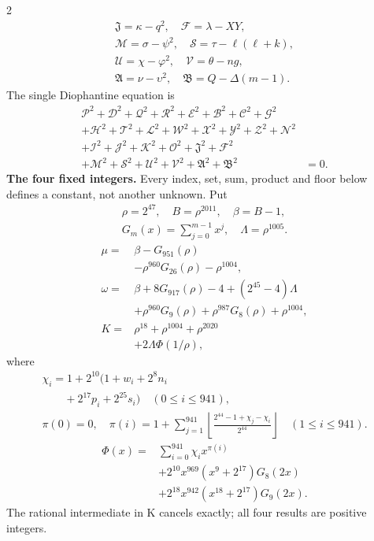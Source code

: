 \documentclass[10pt]{article}
\newcommand{\fl}[1]{\left\lfloor#1\right\rfloor}
\begin{document}
\begin{multicols}{2}
\[\begin{gathered}
\mathfrak{J}=\kappa-q^2,\quad\mathcal{F}=\lambda-XY,\\
\mathcal{M}=\sigma-\psi^2,\quad\mathcal{S}=\tau-\ell(\ell+k),\\
\mathcal{U}=\chi-\varphi^2,\quad\mathcal{V}=\theta-ng,\\
\mathfrak{A}=\nu-\upsilon^2,\quad\mathfrak{B}=Q-\Delta(m-1).
\end{gathered}
\]
The single Diophantine equation is
\[
\begin{split}
\mathcal{P}^2+\mathcal{D}^2+\mathcal{Q}^2+\mathcal{R}^2+\mathcal{E}^2+\mathcal{B}^2+\mathcal{C}^2+\mathcal{G}^2 &\\
+\mathcal{H}^2+\mathcal{T}^2+\mathcal{L}^2+\mathcal{W}^2+\mathcal{X}^2+\mathcal{Y}^2+\mathcal{Z}^2+\mathcal{N}^2 &\\
+\mathcal{I}^2+\mathcal{J}^2+\mathcal{K}^2+\mathcal{O}^2+\mathfrak{J}^2+\mathcal{F}^2 &\\
+\mathcal{M}^2+\mathcal{S}^2+\mathcal{U}^2+\mathcal{V}^2+\mathfrak{A}^2+\mathfrak{B}^2 &= 0.
\end{split}
\]
\textbf{The four fixed integers.}
Every index, set, sum, product and floor below defines a constant, not
another unknown. Put
\[
\begin{gathered}
\rho=2^{47},\quad B=\rho^{2011},\quad\beta=B-1,\\
G_m(x)=\sum_{j=0}^{m-1}x^j,\quad
\Lambda=\rho^{1005}.
\end{gathered}
\]
\begin{align*}
\mu={}&\beta-G_{951}(\rho)\\
&-\rho^{960}G_{26}(\rho)-\rho^{1004},\\
\omega={}&\beta+8G_{917}(\rho)-4+(2^{45}-4)\Lambda\\
&+\rho^{960}G_9(\rho)+\rho^{987}G_8(\rho)
  +\rho^{1004},\\
K={}&\rho^{18}+\rho^{1004}+\rho^{2020}\\
&+2\Lambda\Phi(1/\rho),
\end{align*}
where
\[
\begin{gathered}
\chi_i=1+2^{10}(1+w_i+2^8n_i\\
\qquad+2^{17}p_i+2^{25}s_i)\quad(0\le i\le941),\\
\pi(0)=0,\quad\pi(i)=1+\sum_{j=1}^{941}
\fl{\frac{2^{44}-1+\chi_j-\chi_i}{2^{44}}}\quad(1\le i\le941).
\end{gathered}
\]
\[
\begin{split}
\Phi(x)={}&\sum_{i=0}^{941}\chi_i x^{\pi(i)}\\
&+2^{10}x^{969}(x^9+2^{17})G_8(2x)\\
&+2^{18}x^{942}(x^{18}+2^{17})G_9(2x).
\end{split}
\]
The rational intermediate in K cancels exactly; all four results are positive integers.


\end{multicols}
\end{document}
